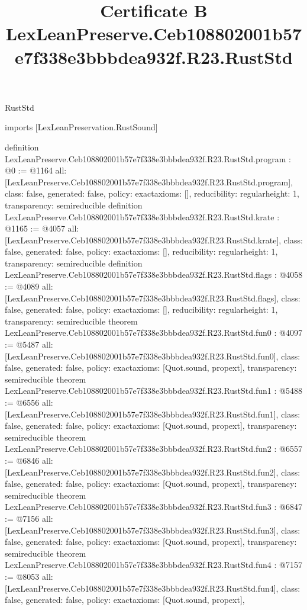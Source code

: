 \begin{lexlean}{RustStd}
\title{Certificate B LexLeanPreserve.Ceb108802001b57e7f338e3bbbdea932f.R23.RustStd}
\begin{coremodule}
imports [LexLeanPreservation.RustSound]

definition LexLeanPreserve.Ceb108802001b57e7f338e3bbbdea932f.R23.RustStd.program : @0 := @1164 {
  all: [LexLeanPreserve.Ceb108802001b57e7f338e3bbbdea932f.R23.RustStd.program],
  class: false,
  generated: false,
  policy: exact{axioms: []},
  reducibility: regular{height: 1},
  transparency: semireducible
}
definition LexLeanPreserve.Ceb108802001b57e7f338e3bbbdea932f.R23.RustStd.krate : @1165 := @4057 {
  all: [LexLeanPreserve.Ceb108802001b57e7f338e3bbbdea932f.R23.RustStd.krate],
  class: false,
  generated: false,
  policy: exact{axioms: []},
  reducibility: regular{height: 1},
  transparency: semireducible
}
definition LexLeanPreserve.Ceb108802001b57e7f338e3bbbdea932f.R23.RustStd.flags : @4058 := @4089 {
  all: [LexLeanPreserve.Ceb108802001b57e7f338e3bbbdea932f.R23.RustStd.flags],
  class: false,
  generated: false,
  policy: exact{axioms: []},
  reducibility: regular{height: 1},
  transparency: semireducible
}
theorem LexLeanPreserve.Ceb108802001b57e7f338e3bbbdea932f.R23.RustStd.fun0 : @4097 := @5487 {
  all: [LexLeanPreserve.Ceb108802001b57e7f338e3bbbdea932f.R23.RustStd.fun0],
  class: false,
  generated: false,
  policy: exact{axioms: [Quot.sound, propext]},
  transparency: semireducible
}
theorem LexLeanPreserve.Ceb108802001b57e7f338e3bbbdea932f.R23.RustStd.fun1 : @5488 := @6556 {
  all: [LexLeanPreserve.Ceb108802001b57e7f338e3bbbdea932f.R23.RustStd.fun1],
  class: false,
  generated: false,
  policy: exact{axioms: [Quot.sound, propext]},
  transparency: semireducible
}
theorem LexLeanPreserve.Ceb108802001b57e7f338e3bbbdea932f.R23.RustStd.fun2 : @6557 := @6846 {
  all: [LexLeanPreserve.Ceb108802001b57e7f338e3bbbdea932f.R23.RustStd.fun2],
  class: false,
  generated: false,
  policy: exact{axioms: [Quot.sound, propext]},
  transparency: semireducible
}
theorem LexLeanPreserve.Ceb108802001b57e7f338e3bbbdea932f.R23.RustStd.fun3 : @6847 := @7156 {
  all: [LexLeanPreserve.Ceb108802001b57e7f338e3bbbdea932f.R23.RustStd.fun3],
  class: false,
  generated: false,
  policy: exact{axioms: [Quot.sound, propext]},
  transparency: semireducible
}
theorem LexLeanPreserve.Ceb108802001b57e7f338e3bbbdea932f.R23.RustStd.fun4 : @7157 := @8053 {
  all: [LexLeanPreserve.Ceb108802001b57e7f338e3bbbdea932f.R23.RustStd.fun4],
  class: false,
  generated: false,
  policy: exact{axioms: [Quot.sound, propext]},
}
\end{coremodule}
\end{lexlean}
